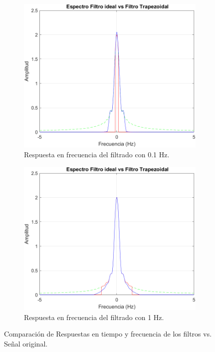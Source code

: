 \begin{figure}[H]
\begin{subfigure}[b]{0.48\linewidth}
	\end{subfigure}
	\begin{subfigure}[b]{0.48\linewidth}
		\includegraphics[width=\linewidth]{img/E0-1Hz}
		\caption{\scriptsize Respuesta en frecuencia del filtrado con 0.1 Hz.}
		\label{subfig:frecuencia01}
	\end{subfigure}
	\begin{subfigure}[b]{0.48\linewidth}
		\includegraphics[width=\linewidth]{img/E1Hz}
		\caption{\scriptsize Respuesta en frecuencia del filtrado con 1 Hz.}
		\label{subfig:frecuencia1}
	\end{subfigure}
	\caption{\scriptsize Comparación de Respuestas en tiempo y frecuencia de los filtros vs. Señal original.}
	\label{fig:frecuenciaRayleigh}
	\vspace{-5mm}
\end{figure}

